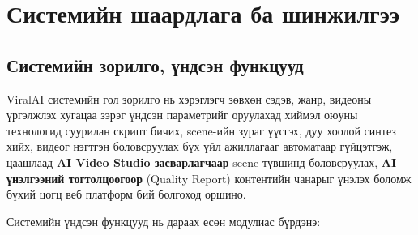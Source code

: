 
\chapter{Системийн шаардлага ба шинжилгээ}
\label{Chapter3}
\pagecolor{white}

\section{Системийн зорилго, үндсэн функцууд}

ViralAI системийн гол зорилго нь хэрэглэгч зөвхөн сэдэв, жанр, видеоны үргэлжлэх хугацаа зэрэг үндсэн параметрийг оруулахад хиймэл оюуны технологид суурилан скрипт бичих, scene-ийн зураг үүсгэх, дуу хоолой синтез хийх, видеог нэгтгэн боловсруулах бүх үйл ажиллагааг автоматаар гүйцэтгэж, цаашлаад \textbf{AI Video Studio засварлагчаар} scene түвшинд боловсруулах, \textbf{AI үнэлгээний тогтолцоогоор} (Quality Report) контентийн чанарыг үнэлэх боломж бүхий цогц веб платформ бий болгоход оршино.

Системийн үндсэн функцууд нь дараах есөн модулиас бүрдэнэ:

